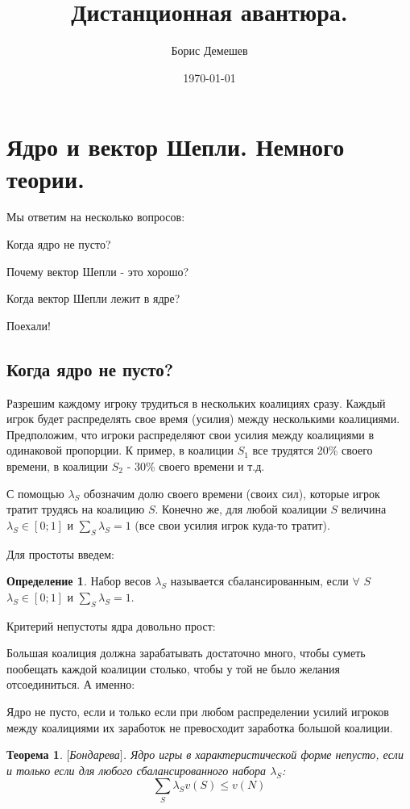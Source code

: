 \documentclass[pdftex,12pt,a4paper]{article}
\title{Дистанционная авантюра.}
\author{Борис Демешев}
\date{\today}
\numberwithin{equation}{page} %
\newtheorem{theorem}[equation]{Теорема} %
\theoremstyle{definition} %
\newtheorem{definition}[equation]{Определение}
\theoremstyle{definition}
\theoremstyle{definition}
\begin{document}

\section{Ядро и вектор Шепли. Немного теории.}

Мы ответим на несколько вопросов:

Когда ядро не пусто?

Почему вектор Шепли - это хорошо?

Когда вектор Шепли лежит в ядре?

Поехали!

\subsection{Когда ядро не пусто?}

Разрешим каждому игроку трудиться в нескольких коалициях сразу. Каждый игрок будет распределять свое время (усилия) между несколькими коалициями. Предположим, что игроки распределяют свои усилия между коалициями в одинаковой пропорции. К пример, в коалиции $S_{1}$ все трудятся 20\% своего времени, в коалиции $S_{2}$ - 30\% своего времени и т.д. 

С помощью $\lambda_{S}$ обозначим долю своего времени (своих сил), которые игрок тратит трудясь на коалицию $S$. Конечно же, для любой коалиции $S$ величина $\lambda_{S}\in [0;1]$ и $\sum_{S} \lambda_{S}=1$ (все свои усилия игрок куда-то тратит). 

Для простоты введем:
\begin{definition}
Набор весов $\lambda_{S}$ называется сбалансированным, если $\forall$ $S$ $\lambda_{S}\in[0;1]$ и $\sum_{S} \lambda_{S}=1$.
\end{definition}

Критерий непустоты ядра довольно прост:

Большая коалиция должна зарабатывать достаточно много, чтобы суметь пообещать каждой коалиции столько, чтобы у той не было желания отсоединиться. А именно:

Ядро не пусто, если и только если при любом распределении усилий игроков между коалициями их заработок не превосходит заработка большой коалиции.

\begin{theorem} $[$Бондарева$]$.
Ядро игры в характеристической форме непусто, если и только если для любого сбалансированного набора $\lambda_{S}$:
\begin{equation}
\sum_{S} \lambda_{S}v(S)\leq v(N)
\end{equation}
\end{theorem}
\end{document}
